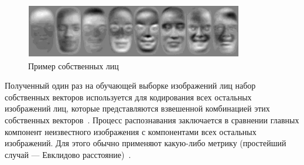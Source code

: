 \begin{figure}[h]
	\centering
	\includegraphics[width=0.85\textwidth]{img/pca2.png} 
	\caption{Пример собственных лиц~\cite{brilyuk}}
	\label{fig:pca2}
\end{figure}

Полученный один раз на обучающей выборке изображений лиц набор собственных векторов используется для кодирования всех остальных изображений лиц, которые представляются взвешенной комбинацией этих собственных векторов~\cite{parshin}. Процесс распознавания заключается в сравнении главных компонент неизвестного изображения с компонентами всех остальных изображений. Для этого обычно применяют какую-либо метрику (простейший случай --- Евклидово расстояние)~\cite{brilyuk}. 
	